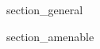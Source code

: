 \documentclass[12pt, class = report, crop = false, a4paper, twoside]{standalone}
\begin{document}
\label{chap:I}


{section_general}


{section_amenable}
\end{document}

